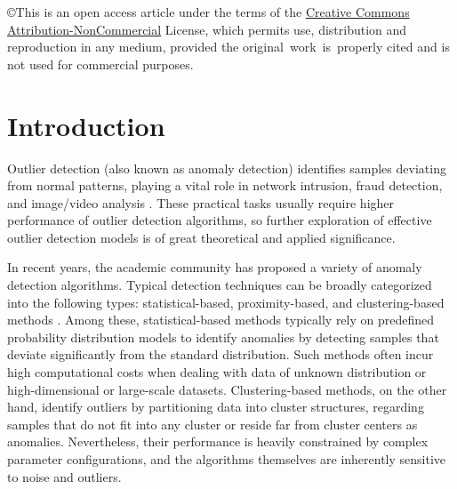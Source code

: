 \documentclass[ASNA,twocolumn]{USG} %
\begin{document}



\copyright{This is an open access article under the terms of the \href{Creative Commons Attribution-NonCommercial}{Creative Commons Attribution-NonCommercial} License, which permits use, distribution and reproduction in any medium, provided the
original~work~is~properly cited and is not used for commercial purposes.
}


\maketitle


\section{Introduction}\label{Introduction}

Outlier detection (also known as anomaly detection) identifies samples deviating from normal patterns, playing a vital role in network intrusion, fraud detection, and image/video analysis \cite{choras2012statistical, hilal2022financial, pei2024robust, shaik2025leveraging}. These practical tasks usually require higher performance of outlier detection algorithms, so further exploration of effective outlier detection models is of great theoretical and applied significance.

In recent years, the academic community has proposed a variety of anomaly detection algorithms. Typical detection techniques can be broadly categorized into the following types: statistical-based, proximity-based, and clustering-based methods \cite{smiti2020critical}.
Among these, statistical-based methods typically rely on predefined probability distribution models to identify anomalies by detecting samples that deviate significantly from the standard distribution. Such methods often incur high computational costs when dealing with data of unknown distribution or high-dimensional or large-scale datasets. Clustering-based methods, on the other hand, identify outliers by partitioning data into cluster structures, regarding samples that do not fit into any cluster or reside far from cluster centers as anomalies. Nevertheless, their performance is heavily constrained by complex parameter configurations, and the algorithms themselves are inherently sensitive to noise and outliers.
\end{document}
